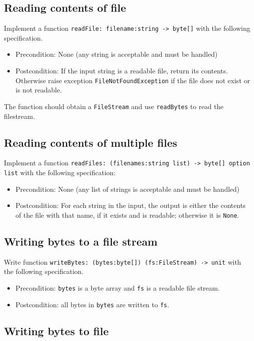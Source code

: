 \subsection*{Reading contents of file}

Implement a function \texttt{readFile: filename:string -> byte[]} with the following specification. 
\begin{itemize}
\item Precondition: None (any string is acceptable and must be handled)
\item Postcondition: If the input string is a readable file, return its contents.  Otherwise raise exception \texttt{FileNotFoundException} if the file does not exist or is not readable.
\end{itemize}

The function should obtain a \texttt{FileStream} and use \texttt{readBytes} to read the filestream. 

\subsection*{Reading contents of multiple files}
 
Implement a function \texttt{readFiles: (filenames:string list) -> byte[] option list} with the following specification:
\begin{itemize}
\item Precondition: None (any list of strings is acceptable and must be handled)
\item Postcondition: For each string in the input, the output is either the contents of the file with that name, if it exists and is readable; otherwise it is \texttt{None}.  
\end{itemize}

\subsection*{Writing bytes to a file stream}

Write function \texttt{writeBytes: (bytes:byte[]) (fs:FileStream) -> unit} with the following specification.  
\begin{itemize}
\item Precondition: \texttt{bytes} is a byte array and \texttt{fs} is a readable file stream.
\item Postcondition: all bytes in \texttt{bytes} are written to \texttt{fs}.
\end{itemize}

\subsection*{Writing bytes to file}

